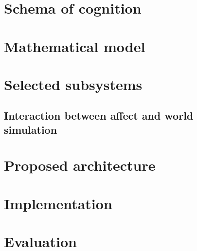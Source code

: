 \documentclass[]{scrartcl}
\begin{document}


\section{Schema of cognition}\label{sec:schemaOfCognition}



\section{Mathematical model}\label{sec:mathematicalModel}



\section{Selected subsystems}\label{sec:selectedSubsystems}



\subsection{Interaction between affect and world simulation}



\section{Proposed architecture}\label{sec:proposedArchitecture}


\section{Implementation}



\section{Evaluation}


\endgroup

\pagebreak

\nocite{*}



\end{document}
